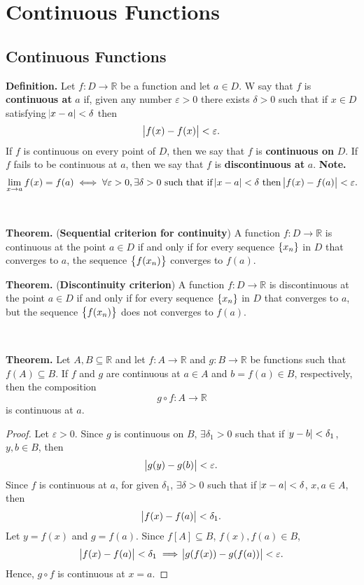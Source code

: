 \documentclass[12pt,a4paper]{article}
\begin{document}
\newpage
\section{Continuous Functions}

\subsection{Continuous Functions}
\begin{tcolorbox}[colback=white]
	\textbf{Definition.} Let $f:D\to\mathbb{R}$ be a function and let $a\in D$. W say that $f$ is \textbf{continuous at} $a$ if, given any number $\varepsilon>0$ there exists $\delta>0$ such that if $x\in D$ satisfying $\abs{x-a}<\delta$ then \[
	\abs{f(x)-f(x)}<\varepsilon.
	\] If $f$ is continuous on every point of $D$, then we say that $f$ is \textbf{continuous on} $D$. If $f$ fails to be continuous at $a$, then we say that $f$ is \textbf{discontinuous at} $a$.\tcblower
	\textbf{Note.}\[
	\lim\limits_{x\to a}f(x)=f(a)\iff\forall\varepsilon>0,\exists\delta>0\ \text{such that if $\abs{x-a}<\delta$ then $\abs{f(x)-f(a)}<\varepsilon$}.
	\]
\end{tcolorbox}\
\
\begin{tcolorbox}[colback=white]
	\textbf{Theorem.} (\textbf{Sequential criterion for continuity}) A function $f:D\to\mathbb{R}$ is continuous at the point $a\in D$ if and only if for every sequence $\set{x_n}$ in $D$ that converges to $a$, the sequence $\set{f(x_n)}$ converges to $f(a)$.
\end{tcolorbox}
\begin{tcolorbox}[colback=white]
	\textbf{Theorem.} (\textbf{Discontinuity criterion}) A function $f:D\to\mathbb{R}$ is discontinuous at the point $a\in D$ if and only if for every sequence $\set{x_n}$ in $D$ that converges to $a$, but the sequence $\set{f(x_n)}$ does not converges to $f(a)$.
\end{tcolorbox}
\
\begin{tcolorbox}[colback=white]
	\textbf{Theorem.} Let $A,B\subseteq\mathbb{R}$ and let $f:A\to\mathbb{R}$ and $g:B\to\mathbb{R}$ be functions such that $f(A)\subseteq B$. If $f$ and $g$ are continuous at $a\in A$ and $b=f(a)\in B$, respectively, then the composition \[
	g\circ f:A\to\mathbb{R}
	\] is continuous at $a$.\tcblower\begin{proof}
		Let $\varepsilon>0$. Since $g$ is continuous on $B$, $\exists\delta_1>0$ such that if $\abs{y-b}<\delta_1$, $y,b\in B$, then \[
		\abs{g(y)-g(b)}<\varepsilon.
		\] Since $f$ is continuous at $a$, for given $\delta_1$, $\exists\delta>0$ such that if $\abs{x-a}<\delta$, $x,a\in A$, then \[
		\abs{f(x)-f(a)}<\delta_1.
		\] Let $y=f(x)$ and $g=f(a)$. Since $f[A]\subseteq B$, $f(x),f(a)\in B$, \[
		\abs{f(x)-f(a)}<\delta_1\implies \abs{g(f(x))-g(f(a))}<\varepsilon.
		\] Hence, $g\circ f$ is continuous at $x=a$.
	\end{proof}
\end{tcolorbox}\
\end{document}
